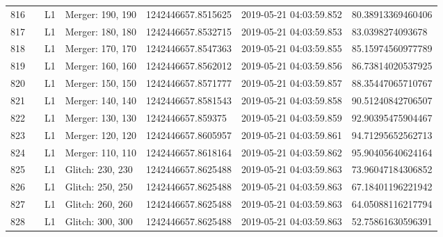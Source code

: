 \begin{longtable}{lllllll}
816  &                                                    &       L1 &  Merger: 190, 190 &  1242446657.8515625 &  2019-05-21 04:03:59.852 &   80.38913369460406 \\
817  &                                                    &       L1 &  Merger: 180, 180 &  1242446657.8532715 &  2019-05-21 04:03:59.853 &    83.0398274093678 \\
818  &                                                    &       L1 &  Merger: 170, 170 &  1242446657.8547363 &  2019-05-21 04:03:59.855 &   85.15974560977789 \\
819  &                                                    &       L1 &  Merger: 160, 160 &  1242446657.8562012 &  2019-05-21 04:03:59.856 &   86.73814020537925 \\
820  &                                                    &       L1 &  Merger: 150, 150 &  1242446657.8571777 &  2019-05-21 04:03:59.857 &   88.35447065710767 \\
821  &                                                    &       L1 &  Merger: 140, 140 &  1242446657.8581543 &  2019-05-21 04:03:59.858 &   90.51240842706507 \\
822  &                                                    &       L1 &  Merger: 130, 130 &   1242446657.859375 &  2019-05-21 04:03:59.859 &   92.90395475904467 \\
823  &                                                    &       L1 &  Merger: 120, 120 &  1242446657.8605957 &  2019-05-21 04:03:59.861 &   94.71295652562713 \\
824  &                                                    &       L1 &  Merger: 110, 110 &  1242446657.8618164 &  2019-05-21 04:03:59.862 &   95.90405640624164 \\
825  &                                                    &       L1 &  Glitch: 230, 230 &  1242446657.8625488 &  2019-05-21 04:03:59.863 &   73.96047184306852 \\
826  &                                                    &       L1 &  Glitch: 250, 250 &  1242446657.8625488 &  2019-05-21 04:03:59.863 &   67.18401196221942 \\
827  &                                                    &       L1 &  Glitch: 260, 260 &  1242446657.8625488 &  2019-05-21 04:03:59.863 &   64.05088116217794 \\
828  &                                                    &       L1 &  Glitch: 300, 300 &  1242446657.8625488 &  2019-05-21 04:03:59.863 &   52.75861630596391 \\

\end{longtable}
